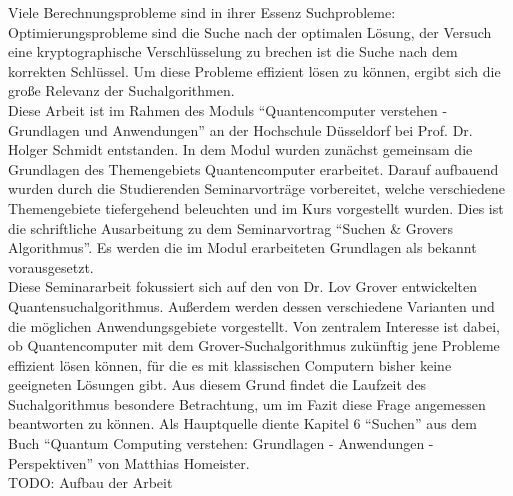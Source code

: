 Viele Berechnungsprobleme sind in ihrer Essenz Suchprobleme: Optimierungsprobleme sind die Suche nach der optimalen Lösung, der Versuch eine kryptographische Verschlüsselung zu brechen ist die Suche nach dem korrekten Schlüssel. Um diese Probleme effizient lösen zu können, ergibt sich die große Relevanz der Suchalgorithmen.
\\
Diese Arbeit ist im Rahmen des Moduls “Quantencomputer verstehen - Grundlagen und Anwendungen” an der Hochschule Düsseldorf bei Prof. Dr. Holger Schmidt entstanden. In dem Modul wurden zunächst gemeinsam die Grundlagen des Themengebiets Quantencomputer erarbeitet. Darauf aufbauend wurden durch die Studierenden Seminarvorträge vorbereitet, welche verschiedene Themengebiete tiefergehend beleuchten und im Kurs vorgestellt wurden. Dies ist die schriftliche Ausarbeitung zu dem Seminarvortrag “Suchen \& Grovers Algorithmus”. Es werden die im Modul erarbeiteten Grundlagen als bekannt vorausgesetzt.
\\
Diese Seminararbeit fokussiert sich auf den von Dr. Lov Grover entwickelten Quantensuchalgorithmus. Außerdem werden dessen verschiedene Varianten und die möglichen Anwendungsgebiete vorgestellt.
Von zentralem Interesse ist dabei, ob Quantencomputer mit dem Grover-Suchalgorithmus zukünftig jene Probleme effizient lösen können, für die es mit klassischen Computern bisher keine geeigneten Lösungen gibt. 
Aus diesem Grund findet die Laufzeit des Suchalgorithmus besondere Betrachtung, um im Fazit diese Frage angemessen beantworten zu können. 
Als Hauptquelle diente Kapitel 6 “Suchen” aus dem Buch “Quantum Computing verstehen: Grundlagen - Anwendungen - Perspektiven” von Matthias Homeister.
\\
TODO: Aufbau der Arbeit